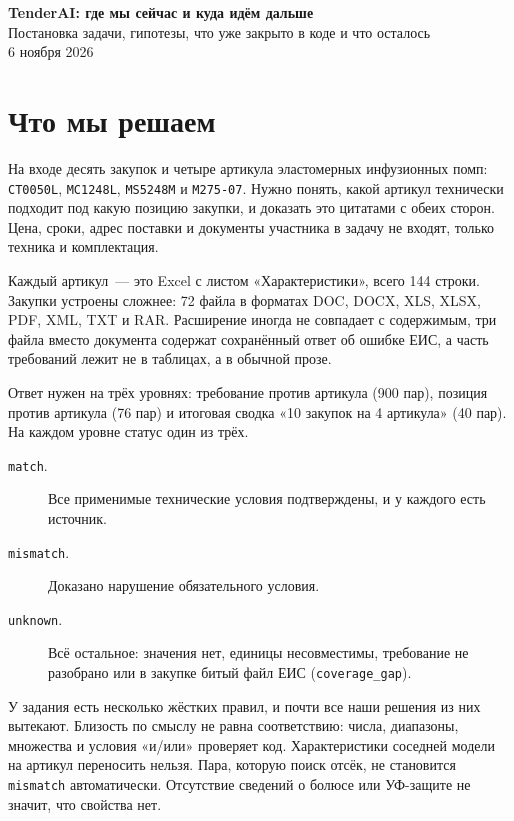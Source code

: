 \documentclass[11pt,a4paper]{article}
\begin{document}
\begin{center}
{\LARGE\bfseries TenderAI: где мы сейчас и куда идём дальше}\\[0.7em]
{\large Постановка задачи, гипотезы, что уже закрыто в коде и что осталось}\\[0.5em]
{\small 6 ноября 2026}
\end{center}
\bigskip

\section{Что мы решаем}

На входе десять закупок и четыре артикула эластомерных инфузионных помп: \texttt{CT0050L}, \texttt{MC1248L}, \texttt{MS5248M} и \texttt{M275-07}. Нужно понять, какой артикул технически подходит под какую позицию закупки, и доказать это цитатами с обеих сторон. Цена, сроки, адрес поставки и документы участника в задачу не входят, только техника и комплектация.

Каждый артикул~--- это Excel с листом «Характеристики», всего 144 строки. Закупки устроены сложнее: 72 файла в форматах DOC, DOCX, XLS, XLSX, PDF, XML, TXT и RAR. Расширение иногда не совпадает с содержимым, три файла вместо документа содержат сохранённый ответ об ошибке ЕИС, а часть требований лежит не в таблицах, а в обычной прозе.

Ответ нужен на трёх уровнях: требование против артикула (900 пар), позиция против артикула (76 пар) и итоговая сводка «10 закупок на 4 артикула» (40 пар). На каждом уровне статус один из трёх.

\begin{description}
  \item[\texttt{match}.] Все применимые технические условия подтверждены, и у каждого есть источник.
  \item[\texttt{mismatch}.] Доказано нарушение обязательного условия.
  \item[\texttt{unknown}.] Всё остальное: значения нет, единицы несовместимы, требование не разобрано или в закупке битый файл ЕИС (\texttt{coverage\_gap}).
\end{description}

У задания есть несколько жёстких правил, и почти все наши решения из них вытекают. Близость по смыслу не равна соответствию: числа, диапазоны, множества и условия «и/или» проверяет код. Характеристики соседней модели на артикул переносить нельзя. Пара, которую поиск отсёк, не становится \texttt{mismatch} автоматически. Отсутствие сведений о болюсе или УФ-защите не значит, что свойства нет.
\end{document}
